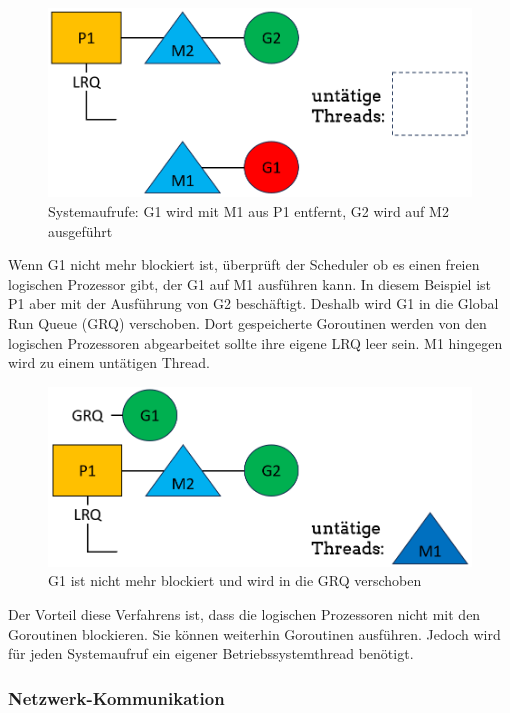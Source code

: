 \documentclass[fontsize=12pt,paper=a4,twoside=semi,parskip=half-,headsepline,headinclude]{scrreprt}
\begin{document}
\begin{figure}[h]
	\centering
	\includegraphics[scale=0.5]{figures/GoroutineSystemaufrufe2.png}
	\caption{Systemaufrufe: G1 wird mit M1 aus P1 entfernt, G2 wird auf M2 ausgeführt}
	\label{fig:GoroutineSystemaufrufe2}
\end{figure}

Wenn G1 nicht mehr blockiert ist, überprüft der Scheduler ob es einen freien logischen Prozessor gibt, der G1 auf M1 ausführen kann. In diesem Beispiel ist P1 aber mit der Ausführung von G2 beschäftigt. Deshalb wird G1 in die Global Run Queue (GRQ) verschoben. Dort gespeicherte Goroutinen werden von den logischen Prozessoren abgearbeitet sollte ihre eigene LRQ leer sein. M1 hingegen wird zu einem untätigen Thread.

\begin{figure}[h]
	\centering
	\includegraphics[scale=0.5]{figures/GoroutineSystemaufrufe3.png}
	\caption{G1 ist nicht mehr blockiert und wird in die GRQ verschoben}
	\label{fig:GoroutineSystemaufrufe3}
\end{figure}

Der Vorteil diese Verfahrens ist, dass die logischen Prozessoren nicht mit den Goroutinen blockieren. Sie können weiterhin Goroutinen ausführen. Jedoch wird für jeden Systemaufruf ein eigener Betriebssystemthread benötigt.

\subsubsection{Netzwerk-Kommunikation}
\end{document}
